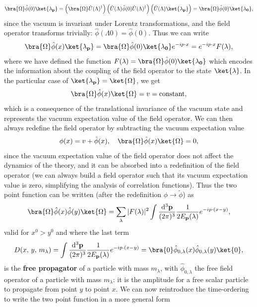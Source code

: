 \[
    \bra{\Omega} \hat{\phi}(0) \ket{\lambda_{\mathbf{p}}} = \left(\bra{\Omega} \hat{U}(\Lambda)^{\dagger}\right) \left(\hat{U}(\Lambda) \hat{\phi}(0) \hat{U}(\Lambda)^{\dagger}\right) \left(\hat{U}(\Lambda) \ket{\lambda_{\mathbf{p}}}\right) = \bra{\Omega} \hat{\phi}(0) \ket{\lambda_{\mathbf{0}}},
\]
since the vacuum is invariant under Lorentz transformations, and the field operator transforms trivially: \(\hat{\phi}(\Lambda 0) = \hat{\phi}(0)\). Thus we can write
\[
    \bra{\Omega} \hat{\phi}(x) \ket{\lambda_{\mathbf{p}}} = \bra{\Omega} \hat{\phi}(0) \ket{\lambda_{\mathbf{0}}} e^{-ip \cdot x} = e^{-ip \cdot x} F(\lambda),
\]
where we have defined the function \(F(\lambda) = \bra{\Omega} \hat{\phi}(0) \ket{\lambda_{\mathbf{0}}}\) which encodes the information about the coupling of the field operator to the state \(\ket{\lambda}\). In the particular case of \(\ket{\lambda_{\mathbf{p}}} = \ket{\Omega}\), we get
\[
    \bra{\Omega} \hat{\phi}(x) \ket{\Omega} = v = \text{constant},
\]
which is a consequence of the translational invariance of the vacuum state and represents the vacuum expectation value of the field operator. We can then always redefine the field operator by subtracting the vacuum expectation value
\[
    \phi(x) = v + \tilde{\phi}(x), \quad \bra{\Omega} \tilde{\phi}(x) \ket{\Omega} = 0,
\]
since the vacuum expectation value of the field operator does not affect the dynamics of the theory, and it can be absorbed into a redefinition of the field operator (we can always build a field operator such that its vacuum expectation value is zero, simplifying the analysis of correlation functions). Thus the two point function can be written (after the redefinition \(\phi \to \tilde{\phi}\)) as
\[
    \bra{\Omega} \hat{\phi}(x) \hat{\phi}(y) \ket{\Omega} = \sum_{\lambda} \vert F(\lambda) \vert^2 \int \frac{\mathrm{d}^3 \mathbf{p}}{(2\pi)^3} \frac{1}{2E_{\mathbf{p}}(\lambda)} e^{-ip \cdot (x-y)},
\]
valid for \(x^0 > y^0\) and where the last term
\begin{equation}
    D(x,\,y,\,m_\lambda) = \int \frac{\mathrm{d}^3 \mathbf{p}}{(2\pi)^3} \frac{1}{2E_{\mathbf{p}}(\lambda)} e^{-ip \cdot (x-y)} = \bra{0} \hat{\phi}_{0,\lambda}(x) \hat{\phi}_{0,\lambda}(y) \ket{0},
    \label{eq:free_propagator}
\end{equation}
is the \textbf{free propagator} of a particle with mass \(m_\lambda\), with \(\hat{\phi}_{0,\lambda}\) the free field operator of a particle with mass \(m_\lambda\): it is the amplitude for a free scalar particle to propagate from point \(y\) to point \(x\). We can now reintroduce the time-ordering to write the two point function in a more general form

